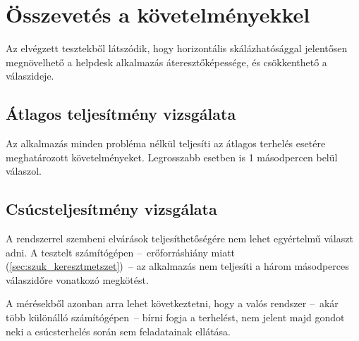 \pagebreak

\section{Összevetés a követelményekkel}
Az elvégzett tesztekből látszódik, hogy horizontális skálázhatósággal jelentősen megnövelhető a helpdesk alkalmazás áteresztőképessége, és csökkenthető a válaszideje.

\subsection{Átlagos teljesítmény vizsgálata}
Az alkalmazás minden probléma nélkül teljesíti az átlagos terhelés esetére meghatározott követelményeket. Legrosszabb esetben is 1 másodpercen belül válaszol.

\subsection{Csúcsteljesítmény vizsgálata}
A rendszerrel szembeni elvárások teljesíthetőségére nem lehet egyértelmű választ adni. A tesztelt számítógépen --~erőforráshiány miatt (\ref{sec:szuk_keresztmetszet})~--   az alkalmazás nem teljesíti a három másodperces válaszidőre vonatkozó megkötést.

A mérésekből azonban arra lehet következtetni, hogy a valós rendszer --~akár több különálló számítógépen~--   bírni fogja a terhelést, nem jelent majd gondot neki a csúcsterhelés során sem feladatainak ellátása.



